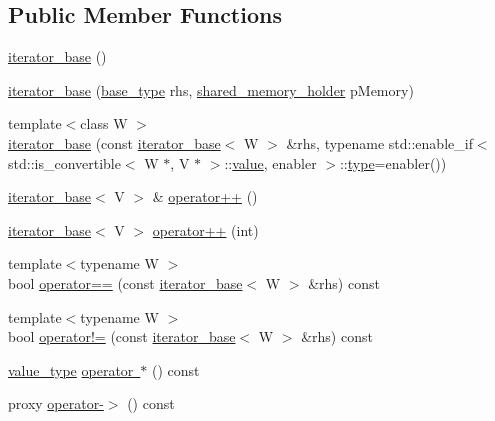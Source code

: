 \subsection*{Public Member Functions}
\begin{DoxyCompactItemize}
\item 
\mbox{\hyperlink{class_y_a_m_l_1_1detail_1_1iterator__base_a89914fa0e9b850871d87944c5c34482c}{iterator\+\_\+base}} ()
\item 
\mbox{\hyperlink{class_y_a_m_l_1_1detail_1_1iterator__base_ae90ad3867f31a1992564eb56dd6d51bd}{iterator\+\_\+base}} (\mbox{\hyperlink{class_y_a_m_l_1_1detail_1_1node__iterator__base}{base\+\_\+type}} rhs, \mbox{\hyperlink{namespace_y_a_m_l_1_1detail_a228c4b3b6ba1058b474d40afc218e21d}{shared\+\_\+memory\+\_\+holder}} p\+Memory)
\item 
{\footnotesize template$<$class W $>$ }\\\mbox{\hyperlink{class_y_a_m_l_1_1detail_1_1iterator__base_a070ff6c447740a54fca23da72e749362}{iterator\+\_\+base}} (const \mbox{\hyperlink{class_y_a_m_l_1_1detail_1_1iterator__base}{iterator\+\_\+base}}$<$ W $>$ \&rhs, typename std\+::enable\+\_\+if$<$ std\+::is\+\_\+convertible$<$ W $\ast$, V $\ast$ $>$\+::\mbox{\hyperlink{glad_8h_a03aff08f73d7fde3d1a08e0abd8e84fa}{value}}, enabler $>$\+::\mbox{\hyperlink{glad_8h_a890efa53b3d7deeeced6f3a0d6653ed3}{type}}=enabler())
\item 
\mbox{\hyperlink{class_y_a_m_l_1_1detail_1_1iterator__base}{iterator\+\_\+base}}$<$ V $>$ \& \mbox{\hyperlink{class_y_a_m_l_1_1detail_1_1iterator__base_ae5680c4b153d5024f3003d5b81da5859}{operator++}} ()
\item 
\mbox{\hyperlink{class_y_a_m_l_1_1detail_1_1iterator__base}{iterator\+\_\+base}}$<$ V $>$ \mbox{\hyperlink{class_y_a_m_l_1_1detail_1_1iterator__base_af89315017de2d593617a1c317cc97553}{operator++}} (int)
\item 
{\footnotesize template$<$typename W $>$ }\\bool \mbox{\hyperlink{class_y_a_m_l_1_1detail_1_1iterator__base_a10797ce7d91dc2766f47817540e08463}{operator==}} (const \mbox{\hyperlink{class_y_a_m_l_1_1detail_1_1iterator__base}{iterator\+\_\+base}}$<$ W $>$ \&rhs) const
\item 
{\footnotesize template$<$typename W $>$ }\\bool \mbox{\hyperlink{class_y_a_m_l_1_1detail_1_1iterator__base_a7dfa171b2e7e04197339c95fe4f23a31}{operator!=}} (const \mbox{\hyperlink{class_y_a_m_l_1_1detail_1_1iterator__base}{iterator\+\_\+base}}$<$ W $>$ \&rhs) const
\item 
\mbox{\hyperlink{class_y_a_m_l_1_1detail_1_1iterator__base_a21987ede08ffbfacc0e3caa39e66cb00}{value\+\_\+type}} \mbox{\hyperlink{class_y_a_m_l_1_1detail_1_1iterator__base_a346a4655f4467cc87d9ae57478344032}{operator $\ast$}} () const
\item 
proxy \mbox{\hyperlink{class_y_a_m_l_1_1detail_1_1iterator__base_a192eb3e0d063efff425edff5cdb70786}{operator-\/$>$}} () const
\end{DoxyCompactItemize}
